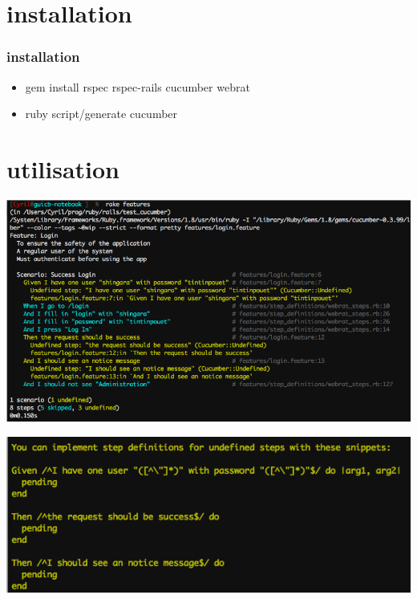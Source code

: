\documentclass{beamer}
\begin{document}
\section{installation}

\begin{frame}
  \frametitle{installation}
  \begin{itemize}
    \item gem install rspec rspec-rails cucumber webrat
    \item ruby script/generate cucumber
  \end{itemize}
\end{frame}

\section{utilisation}

\begin{frame}
  \includegraphics[scale=.4]{features_with_step_undefined}
\end{frame}

\begin{frame}
  \begin{center}
    \includegraphics[scale=.5]{step_missing}
  \end{center}
\end{frame}
\end{document}
